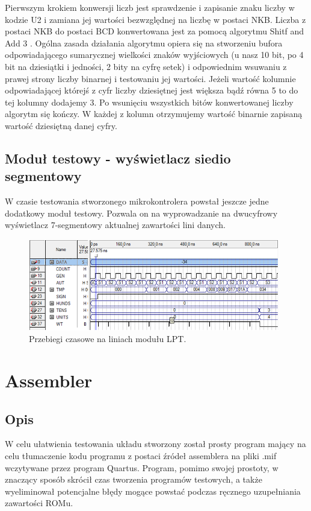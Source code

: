 \documentclass[a4paper,12pt]{report}
\begin{document}
Pierwszym krokiem konwersji liczb jest sprawdzenie i zapisanie znaku liczby w kodzie U2 i zamiana jej wartości bezwzględnej na liczbę w postaci NKB. Liczba z postaci NKB do postaci BCD konwertowana jest za pomocą algorytmu Shitf and Add 3 . Ogólna zasada działania algorytmu opiera się na stworzeniu bufora odpowiadającego sumarycznej wielkości znaków wyjściowych (u nasz 10 bit, po 4 bit na dziesiątki i jedności, 2 bity na cyfrę setek) i odpowiednim wsuwaniu z prawej strony liczby binarnej i testowaniu jej wartości. Jeżeli wartość kolumnie odpowiadającej którejś z cyfr liczby dziesiętnej jest większa bądź równa 5 to do tej kolumny dodajemy 3. Po wsunięciu wszystkich bitów konwertowanej liczby algorytm się kończy. W każdej z kolumn otrzymujemy wartość binarnie zapisaną wartość dziesiętną danej cyfry.

\section{Moduł testowy - wyświetlacz siedio segmentowy}
W czasie testowania stworzonego mikrokontrolera powstał jeszcze jedne dodatkowy moduł testowy. Pozwala on na wyprowadzanie na dwucyfrowy wyświetlacz 7-segmentowy aktualnej zawartości lini danych.

\begin{figure}[h]
\centering
\includegraphics[width=11cm]{./pict/BCD_sim.png}
\caption{Przebiegi czasowe na liniach modułu LPT.}
\label{fig:lBCD_sim}
\end{figure}

\chapter{Assembler}

\section{Opis}

W celu ułatwienia testowania układu stworzony został prosty program mający na celu tłumaczenie kodu programu z postaci źródeł assemblera na pliki .mif wczytywane przez program Quartus. Program, pomimo swojej prostoty, w znaczący sposób skrócił czas tworzenia programów testowych, a także wyeliminował potencjalne błędy mogące powstać podczas ręcznego uzupełniania zawartości ROMu.
\end{document}
